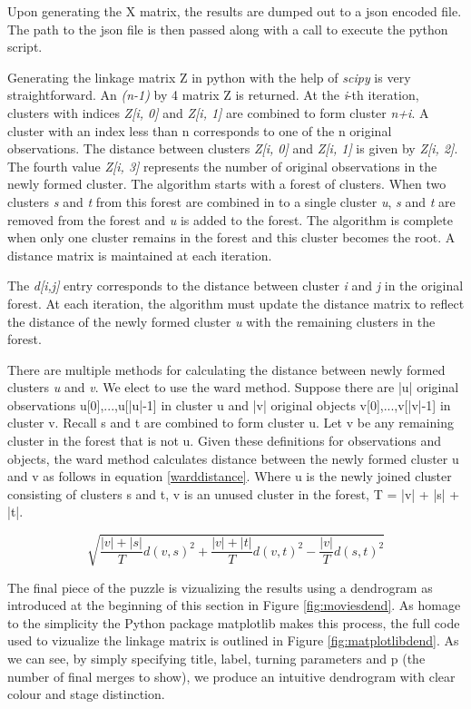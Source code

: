 \documentclass[msc,oneside]{ubcthesis}%
\begin{document}
Upon generating the X matrix, the results are dumped out to a json encoded file. The path to the json file is then passed along with a call to execute the python script.

Generating the linkage matrix Z in python with the help of \textit{scipy} is very straightforward. An \textit{(n-1)} by 4 matrix Z is returned. At the \textit{i}-th iteration, clusters with indices \textit{Z[i, 0]} and \textit{Z[i, 1]} are combined to form cluster \textit{n+i}. A cluster with an index less than n corresponds to one of the n original observations. The distance between clusters \textit{Z[i, 0]} and \textit{Z[i, 1]} is given by \textit{Z[i, 2]}. The fourth value \textit{Z[i, 3]} represents the number of original observations in the newly formed cluster. The algorithm starts with a forest of clusters. When two clusters \textit{s} and \textit{t} from this forest are combined in to a single cluster \textit{u}, \textit{s} and \textit{t} are removed from the forest and \textit{u} is added to the forest. The algorithm is complete when only one cluster remains in the forest and this cluster becomes the root. A distance matrix is maintained at each iteration. 

The \textit{d[i,j]} entry corresponds to the distance between cluster \textit{i} and \textit{j} in the original forest. At each iteration, the algorithm must update the distance matrix to reflect the distance of the newly formed cluster \textit{u} with the remaining clusters in the forest.

There are multiple methods for calculating the distance between newly formed clusters \textit{u} and \textit{v}. We elect to use the ward method. Suppose there are |u| original observations u[0],...,u[|u|-1] in cluster u and |v| original objects v[0],...,v[|v|-1] in cluster v. Recall s and t are combined to form cluster u. Let v be any remaining cluster in the forest that is not u. Given these definitions for observations and objects, the ward method calculates distance between the newly formed cluster u and v as follows in equation \ref{warddistance}. Where u is the newly joined cluster consisting of clusters s and t, v is an unused cluster in the forest, T = |v| + |s| + |t|.

\begin{equation}
\label{warddistance}
\sqrt{\frac{|v| + |s|}{T}d(v,s)^2 + \frac{|v| + |t|}{T}d(v,t)^2 - \frac{|v|}{T}d(s,t)^2}
\end{equation}

The final piece of the puzzle is vizualizing the results using a dendrogram as introduced at the beginning of this section in Figure \ref{fig:moviesdend}. As homage to the simplicity the Python package matplotlib makes this process, the full code used to vizualize the linkage matrix is outlined in Figure \ref{fig:matplotlibdend}. As we can see, by simply specifying title, label, turning parameters and p (the number of final merges to show), we produce an intuitive dendrogram with clear colour and stage distinction.
\end{document}
